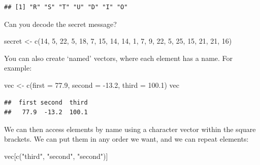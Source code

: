 \documentclass[
  oneside]{book}
\newenvironment{Shaded}{\begin{snugshade}}{\end{snugshade}}
\newcommand{\AttributeTok}[1]{\textcolor[rgb]{0.77,0.63,0.00}{#1}}
\newcommand{\DecValTok}[1]{\textcolor[rgb]{0.00,0.00,0.81}{#1}}
\newcommand{\FloatTok}[1]{\textcolor[rgb]{0.00,0.00,0.81}{#1}}
\newcommand{\FunctionTok}[1]{\textcolor[rgb]{0.00,0.00,0.00}{#1}}
\newcommand{\NormalTok}[1]{#1}
\newcommand{\OtherTok}[1]{\textcolor[rgb]{0.56,0.35,0.01}{#1}}
\newcommand{\SpecialCharTok}[1]{\textcolor[rgb]{0.00,0.00,0.00}{#1}}
\newcommand{\StringTok}[1]{\textcolor[rgb]{0.31,0.60,0.02}{#1}}
\begin{document}
\begin{verbatim}
## [1] "R" "S" "T" "U" "D" "I" "O"
\end{verbatim}

\begin{try}

Can you decode the secret message?

\begin{Shaded}
\begin{Highlighting}[]
\NormalTok{secret }\OtherTok{\textless{}{-}} \FunctionTok{c}\NormalTok{(}\DecValTok{14}\NormalTok{, }\DecValTok{5}\NormalTok{, }\DecValTok{22}\NormalTok{, }\DecValTok{5}\NormalTok{, }\DecValTok{18}\NormalTok{, }\DecValTok{7}\NormalTok{, }\DecValTok{15}\NormalTok{, }\DecValTok{14}\NormalTok{, }\DecValTok{14}\NormalTok{, }\DecValTok{1}\NormalTok{, }\DecValTok{7}\NormalTok{, }\DecValTok{9}\NormalTok{, }\DecValTok{22}\NormalTok{, }\DecValTok{5}\NormalTok{, }\DecValTok{25}\NormalTok{, }\DecValTok{15}\NormalTok{, }\DecValTok{21}\NormalTok{, }\DecValTok{21}\NormalTok{, }\DecValTok{16}\NormalTok{)}
\end{Highlighting}
\end{Shaded}

\end{try}

You can also create `named' vectors, where each element has a name. For example:

\begin{Shaded}
\begin{Highlighting}[]
\NormalTok{vec }\OtherTok{\textless{}{-}} \FunctionTok{c}\NormalTok{(}\AttributeTok{first =} \FloatTok{77.9}\NormalTok{, }\AttributeTok{second =} \SpecialCharTok{{-}}\FloatTok{13.2}\NormalTok{, }\AttributeTok{third =} \FloatTok{100.1}\NormalTok{)}
\NormalTok{vec}
\end{Highlighting}
\end{Shaded}

\begin{verbatim}
##  first second  third 
##   77.9  -13.2  100.1
\end{verbatim}

We can then access elements by name using a character vector within the square brackets. We can put them in any order we want, and we can repeat elements:

\begin{Shaded}
\begin{Highlighting}[]
\NormalTok{vec[}\FunctionTok{c}\NormalTok{(}\StringTok{"third"}\NormalTok{, }\StringTok{"second"}\NormalTok{, }\StringTok{"second"}\NormalTok{)]}
\end{Highlighting}
\end{Shaded}
\end{document}
